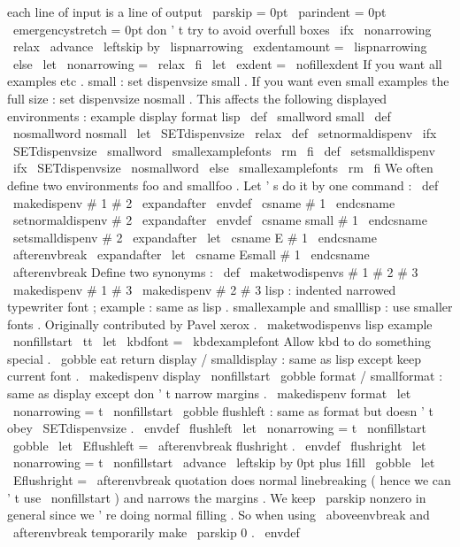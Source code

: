 {{%
each
line
of
input
is
a
line
of
output
\
parskip
=
0pt
\
parindent
=
0pt
\
emergencystretch
=
0pt
%
don
'
t
try
to
avoid
overfull
boxes
\
ifx
\
nonarrowing
\
relax
\
advance
\
leftskip
by
\
lispnarrowing
\
exdentamount
=
\
lispnarrowing
\
else
\
let
\
nonarrowing
=
\
relax
\
fi
\
let
\
exdent
=
\
nofillexdent
}
%
If
you
want
all
examples
etc
.
small
:
set
dispenvsize
small
.
%
If
you
want
even
small
examples
the
full
size
:
set
dispenvsize
nosmall
.
%
This
affects
the
following
displayed
environments
:
%
example
display
format
lisp
%
\
def
\
smallword
{
small
}
\
def
\
nosmallword
{
nosmall
}
\
let
\
SETdispenvsize
\
relax
\
def
\
setnormaldispenv
{
%
\
ifx
\
SETdispenvsize
\
smallword
\
smallexamplefonts
\
rm
\
fi
}
\
def
\
setsmalldispenv
{
%
\
ifx
\
SETdispenvsize
\
nosmallword
\
else
\
smallexamplefonts
\
rm
\
fi
}
%
We
often
define
two
environments
foo
and
smallfoo
.
%
Let
'
s
do
it
by
one
command
:
\
def
\
makedispenv
#
1
#
2
{
\
expandafter
\
envdef
\
csname
#
1
\
endcsname
{
\
setnormaldispenv
#
2
}
\
expandafter
\
envdef
\
csname
small
#
1
\
endcsname
{
\
setsmalldispenv
#
2
}
\
expandafter
\
let
\
csname
E
#
1
\
endcsname
\
afterenvbreak
\
expandafter
\
let
\
csname
Esmall
#
1
\
endcsname
\
afterenvbreak
}
%
Define
two
synonyms
:
\
def
\
maketwodispenvs
#
1
#
2
#
3
{
\
makedispenv
{
#
1
}
{
#
3
}
\
makedispenv
{
#
2
}
{
#
3
}
}
%
lisp
:
indented
narrowed
typewriter
font
;
example
:
same
as
lisp
.
%
%
smallexample
and
smalllisp
:
use
smaller
fonts
.
%
Originally
contributed
by
Pavel
xerox
.
%
\
maketwodispenvs
{
lisp
}
{
example
}
{
%
\
nonfillstart
\
tt
\
let
\
kbdfont
=
\
kbdexamplefont
%
Allow
kbd
to
do
something
special
.
\
gobble
%
eat
return
}
%
display
/
smalldisplay
:
same
as
lisp
except
keep
current
font
.
%
\
makedispenv
{
display
}
{
%
\
nonfillstart
\
gobble
}
%
format
/
smallformat
:
same
as
display
except
don
'
t
narrow
margins
.
%
\
makedispenv
{
format
}
{
%
\
let
\
nonarrowing
=
t
%
\
nonfillstart
\
gobble
}
%
flushleft
:
same
as
format
but
doesn
'
t
obey
\
SETdispenvsize
.
\
envdef
\
flushleft
{
%
\
let
\
nonarrowing
=
t
%
\
nonfillstart
\
gobble
}
\
let
\
Eflushleft
=
\
afterenvbreak
%
flushright
.
%
\
envdef
\
flushright
{
%
\
let
\
nonarrowing
=
t
%
\
nonfillstart
\
advance
\
leftskip
by
0pt
plus
1fill
\
gobble
}
\
let
\
Eflushright
=
\
afterenvbreak
%
quotation
does
normal
linebreaking
(
hence
we
can
'
t
use
\
nonfillstart
)
%
and
narrows
the
margins
.
We
keep
\
parskip
nonzero
in
general
since
%
we
'
re
doing
normal
filling
.
So
when
using
\
aboveenvbreak
and
%
\
afterenvbreak
temporarily
make
\
parskip
0
.
%
\
envdef
\
}
